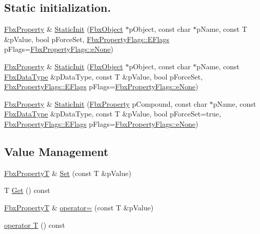 \subsection*{Static initialization.}
\begin{DoxyCompactItemize}
\item 
\hyperlink{class_fbx_property}{Fbx\+Property} \& \hyperlink{class_fbx_property_t_a02493c4d2553aea533bcca9ee6e0c935}{Static\+Init} (\hyperlink{class_fbx_object}{Fbx\+Object} $\ast$p\+Object, const char $\ast$p\+Name, const T \&p\+Value, bool p\+Force\+Set, \hyperlink{class_fbx_property_flags_afabfa7e0949aac8a7dcdf8a141867e99}{Fbx\+Property\+Flags\+::\+E\+Flags} p\+Flags=\hyperlink{class_fbx_property_flags_afabfa7e0949aac8a7dcdf8a141867e99ac1b9aab93d40af76eb419be426de17b1}{Fbx\+Property\+Flags\+::e\+None})
\item 
\hyperlink{class_fbx_property}{Fbx\+Property} \& \hyperlink{class_fbx_property_t_a713fb50a6ca1f7b52f3a24447b2542a2}{Static\+Init} (\hyperlink{class_fbx_object}{Fbx\+Object} $\ast$p\+Object, const char $\ast$p\+Name, const \hyperlink{class_fbx_data_type}{Fbx\+Data\+Type} \&p\+Data\+Type, const T \&p\+Value, bool p\+Force\+Set, \hyperlink{class_fbx_property_flags_afabfa7e0949aac8a7dcdf8a141867e99}{Fbx\+Property\+Flags\+::\+E\+Flags} p\+Flags=\hyperlink{class_fbx_property_flags_afabfa7e0949aac8a7dcdf8a141867e99ac1b9aab93d40af76eb419be426de17b1}{Fbx\+Property\+Flags\+::e\+None})
\item 
\hyperlink{class_fbx_property}{Fbx\+Property} \& \hyperlink{class_fbx_property_t_a54243e267cf06b3a7bd4b7144f8b2cef}{Static\+Init} (\hyperlink{class_fbx_property}{Fbx\+Property} p\+Compound, const char $\ast$p\+Name, const \hyperlink{class_fbx_data_type}{Fbx\+Data\+Type} \&p\+Data\+Type, const T \&p\+Value, bool p\+Force\+Set=true, \hyperlink{class_fbx_property_flags_afabfa7e0949aac8a7dcdf8a141867e99}{Fbx\+Property\+Flags\+::\+E\+Flags} p\+Flags=\hyperlink{class_fbx_property_flags_afabfa7e0949aac8a7dcdf8a141867e99ac1b9aab93d40af76eb419be426de17b1}{Fbx\+Property\+Flags\+::e\+None})
\end{DoxyCompactItemize}
\subsection*{Value Management}
\begin{DoxyCompactItemize}
\item 
\hyperlink{class_fbx_property_t}{Fbx\+PropertyT} \& \hyperlink{class_fbx_property_t_a7245e9041d26955a5c2f31fc40b63228}{Set} (const T \&p\+Value)
\item 
T \hyperlink{class_fbx_property_t_aed683fb109a3a7b1fa4eacd648ae2478}{Get} () const
\item 
\hyperlink{class_fbx_property_t}{Fbx\+PropertyT} \& \hyperlink{class_fbx_property_t_a6334bf20dd8536b5a275c9cfabfa1a67}{operator=} (const T \&p\+Value)
\item 
\hyperlink{class_fbx_property_t_aa4794cefd88b587963f0021c1ec32835}{operator T} () const
\end{DoxyCompactItemize}
